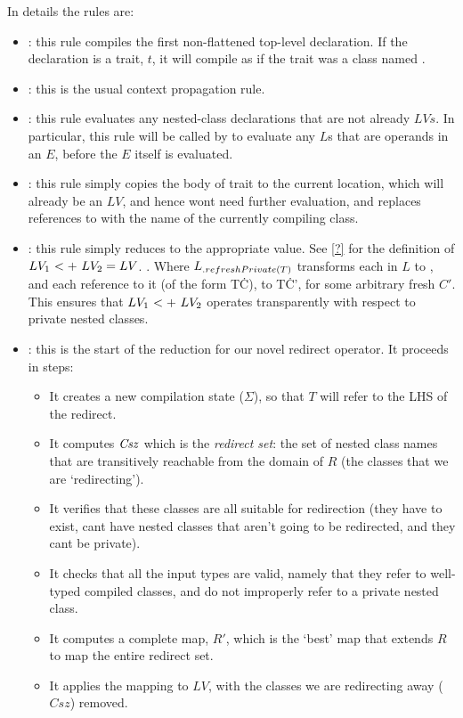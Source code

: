 \noindent In details the rules are:
\begin{itemize}
	\item {}: this rule compiles the first non-flattened top-level declaration. If the declaration is a trait, $t$, it will compile as if the trait was a class named \This.
	\item {}: this is the usual context propagation rule.
	\item {}: this rule evaluates any nested-class declarations that are not already $LVs$. In particular, this rule will be called by  to evaluate any $L$s that are operands in an $E$, before the $E$ itself is evaluated.
	\item {}: this rule simply copies the body of trait to the current location, which will already be an $LV$, and hence wont need further evaluation, and replaces references to \This with the name of the currently compiling class.
	\item {}: this rule simply reduces to the appropriate value. See \autoref{?} for the definition of $\summ{LV_1}{LV_2}=LV$. . Where $L{{}_{.{refreshPrivate}({T})}}$ transforms each  in $L$ to , and each reference to it (of the form T\.C), to T\.C', for some arbitrary fresh $C'$. This ensures that $\summ{LV_1}{LV_2}$ operates transparently with respect to private nested classes.  
	\item {}: this is the start of the reduction for our novel redirect operator. It proceeds in steps:
	\begin{itemize}
		\item It creates a new compilation state ($\Sigma$), so that $T$ will refer to the LHS of the redirect.
		\item It computes $\mathit{Csz}$ which is the \emph{redirect set}: the set of nested class names that are transitively reachable from the domain of $R$ (the classes that we are `redirecting').
		\item It verifies that these classes are all suitable for redirection (they have to exist, cant have nested classes that aren't going to be redirected, and they cant be private).
		\item It checks that all the input types are valid, namely that they refer to well-typed compiled classes, and do not improperly refer to a private nested class.
		\item It computes a complete map, $R'$, which is the `best' map that extends  $R$ to map the entire redirect set.
		\item It applies the mapping to $LV$, with the classes we are redirecting away ($Csz$) removed.
	\end{itemize}
\end{itemize}

